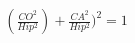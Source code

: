 \documentclass[preview]{standalone}
\begin{document}
\begin{align*}
(\frac{CO^2}{Hip^2})+\frac{CA^2}{Hip^2})^2=1
\end{align*}
\end{document}
